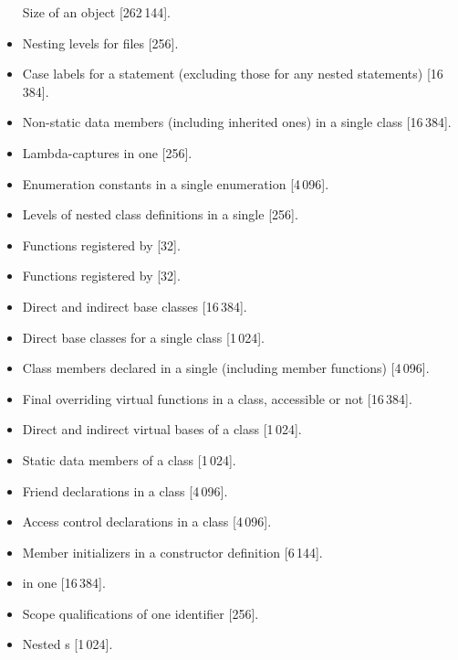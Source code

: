 \begin{itemize}
Size of an object [262\,144].
\item%
Nesting levels for
files [256].
\item%
Case labels for a
statement (excluding those for any nested
statements)
[16\,384].
\item%
Non-static data members (including inherited ones) in a single class [16\,384].
\item%
Lambda-captures in one  [256].
\item%
Enumeration constants in a single enumeration [4\,096].
\item%
Levels of nested class definitions
in a single
[256].
\item%
Functions registered by
 [32].
\item%
Functions registered by
 [32].
\item%
Direct and indirect base classes [16\,384].
\item%
Direct base classes for a single class [1\,024].
\item%
Class members declared in a single 
(including member functions) [4\,096].
\item%
Final overriding virtual functions in a class,
accessible or not [16\,384].
\item%
Direct and indirect virtual bases of a class [1\,024].
\item%
Static data members of a class [1\,024].
\item%
Friend declarations in a class [4\,096].
\item%
Access control declarations in a class [4\,096].
\item%
Member initializers in a constructor definition [6\,144].
\item%
 in one  [16\,384].
\item%
Scope qualifications of one identifier [256].
\item%
Nested s [1\,024].

\end{itemize}

